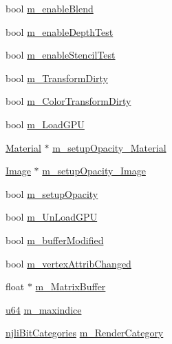 \begin{DoxyCompactItemize}
\item 
bool \mbox{\hyperlink{classnjli_1_1_geometry_ae1d2dde4fa803b27f8743710841a53cb}{m\+\_\+enable\+Blend}}
\item 
bool \mbox{\hyperlink{classnjli_1_1_geometry_a6417e088ae2684f413e37d3fd17e4b90}{m\+\_\+enable\+Depth\+Test}}
\item 
bool \mbox{\hyperlink{classnjli_1_1_geometry_ac546ac75ca65bd355d3a1aca7077a7a1}{m\+\_\+enable\+Stencil\+Test}}
\item 
bool \mbox{\hyperlink{classnjli_1_1_geometry_ad414e27c2a708d6b0e361b88cfd8d75b}{m\+\_\+\+Transform\+Dirty}}
\item 
bool \mbox{\hyperlink{classnjli_1_1_geometry_a27cca52a3235c03f661f5f03a258ea54}{m\+\_\+\+Color\+Transform\+Dirty}}
\item 
bool \mbox{\hyperlink{classnjli_1_1_geometry_a4e9e4a00d2ae14efb4df0fbe1485570f}{m\+\_\+\+Load\+G\+PU}}
\item 
\mbox{\hyperlink{classnjli_1_1_material}{Material}} $\ast$ \mbox{\hyperlink{classnjli_1_1_geometry_a8990f2c3818485e53b23de12fea66468}{m\+\_\+setup\+Opacity\+\_\+\+Material}}
\item 
\mbox{\hyperlink{classnjli_1_1_image}{Image}} $\ast$ \mbox{\hyperlink{classnjli_1_1_geometry_afcd7de399a889620ff0ad2b2f2fc3afa}{m\+\_\+setup\+Opacity\+\_\+\+Image}}
\item 
bool \mbox{\hyperlink{classnjli_1_1_geometry_a55329444afa99dbd6fd3092e550c3618}{m\+\_\+setup\+Opacity}}
\item 
bool \mbox{\hyperlink{classnjli_1_1_geometry_acab3d6720f978b23572f0ae75486a14f}{m\+\_\+\+Un\+Load\+G\+PU}}
\item 
bool \mbox{\hyperlink{classnjli_1_1_geometry_a6dba2ac93b83f9baa5596158e311470b}{m\+\_\+buffer\+Modified}}
\item 
bool \mbox{\hyperlink{classnjli_1_1_geometry_a6a2f29f2dd1c6a0f46a59f719c422a56}{m\+\_\+vertex\+Attrib\+Changed}}
\item 
float $\ast$ \mbox{\hyperlink{classnjli_1_1_geometry_aa2abacdbd107c6b2d23e30be645ff0b6}{m\+\_\+\+Matrix\+Buffer}}
\item 
\mbox{\hyperlink{_util_8h_ad758b7a5c3f18ed79d2fcd23d9f16357}{u64}} \mbox{\hyperlink{classnjli_1_1_geometry_ac610f319fbf74cee097fc579ab61e6a4}{m\+\_\+maxindice}}
\item 
\mbox{\hyperlink{namespacenjli_af7b302a2b48bb644f85c88080925c974}{njli\+Bit\+Categories}} \mbox{\hyperlink{classnjli_1_1_geometry_ae021b501c8e2052a24ac3139461b86f3}{m\+\_\+\+Render\+Category}}
\end{DoxyCompactItemize}
